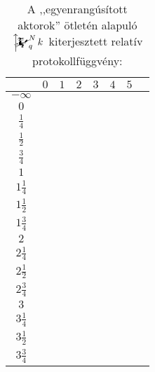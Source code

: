 \documentclass{article}
\newcommand{\blk}{\cellcolor{darkgray}}
\newcommand{\red}{\cellcolor{red!33}}
\newcommand{\grn}{\cellcolor{green!33}}
\newcommand{\nothing}{\text{\raisebox{0.4em}{\rotatebox{180}{$\curvearrowleft$}}}}%
\newcommand{\just}[1]{\boxed{#1}}%
\newcommand{\incl}{\mathbf{incl}}
\newcommand{\excl}{\mathbf{excl}}
\newcommand{\mainfunext}[3]{\left\uparrow\!\!\!\mathwitch*_{#2}^{#1}#3\right.}
\begin{document}
	\begin{table}[H]
		\caption*{A ,,egyenrangúsított aktorok'' ötletén alapuló $\mainfunext Nqk$ kiterjesztett relatív protokollfüggvény:}
		\centering
		\begin{tabular}{c||c|c|c|c|c|c|c|}
				&	$0$		&	$1$		&	$2$		&	$3$		&	$4$		&	$5$		\\\hline\hline
		$-\infty$	&	\nothing	&	\nothing	&	\nothing	&	\nothing	&	\nothing	&	\nothing	\\\hline
			$0$	&	\nothing	&	\nothing	&	\nothing	&	\nothing	&	\nothing	&	\grn\just\incl	\\\hline
		$\frac14$	&	\nothing	&	\nothing	&	\nothing	&	\nothing	&	\nothing	&	\grn\just\incl	\\\hline
		$\frac12$	&	\red\just\excl	&	\nothing	&	\nothing	&	\nothing	&	\nothing	&	\grn\just\incl	\\\hline
		$\frac34$	&	\red\just\excl	&	\nothing	&	\nothing	&	\nothing	&	\nothing	&	\grn\just\incl	\\\hline
			$1$	&	\red\just\excl	&	\nothing	&	\nothing	&	\nothing	&	\grn\just\incl	&	\blk		\\\hline
		$1\frac14$	&	\red\just\excl	&	\nothing	&	\nothing	&	\nothing	&	\grn\just\incl	&	\blk		\\\hline
		$1\frac12$	&	\blk		&	\red\just\excl	&	\nothing	&	\nothing	&	\grn\just\incl	&	\blk		\\\hline
		$1\frac34$	&	\blk		&	\red\just\excl	&	\nothing	&	\nothing	&	\grn\just\incl	&	\blk		\\\hline
			$2$	&	\blk		&	\red\just\excl	&	\nothing	&	\grn\just\incl	&	\blk		&	\blk		\\\hline
		$2\frac14$	&	\blk		&	\red\just\excl	&	\nothing	&	\grn\just\incl	&	\blk		&	\blk		\\\hline
		$2\frac12$	&	\blk		&	\blk		&	\red\just\excl	&	\grn\just\incl	&	\blk		&	\blk		\\\hline
		$2\frac34$	&	\blk		&	\blk		&	\red\just\excl	&	\grn\just\incl	&	\blk		&	\blk		\\\hline
			$3$	&	\blk		&	\blk		&	\blk		&	\blk		&	\blk		&	\blk		\\\hline
		$3\frac14$	&	\blk		&	\blk		&	\blk		&	\blk		&	\blk		&	\blk		\\\hline
		$3\frac12$	&	\blk		&	\blk		&	\blk		&	\blk		&	\blk		&	\blk		\\\hline
		$3\frac34$	&	\blk		&	\blk		&	\blk		&	\blk		&	\blk		&	\blk		\\\hline
		\end{tabular}
	\end{table}
\end{document}
